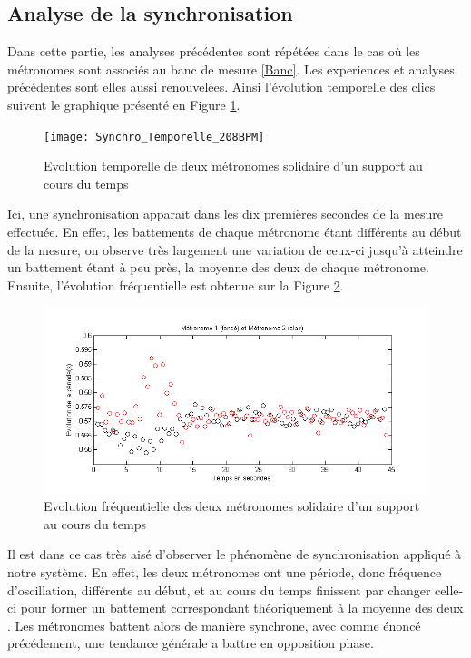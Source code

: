 \documentclass[a4paper,11pt]{report}
\begin{document}
\subsection{Analyse de la synchronisation}
Dans cette partie, les analyses précédentes sont répétées dans le cas où les métronomes sont associés au banc de mesure \ref{Banc}. Les experiences et analyses précédentes sont elles  aussi renouvelées. Ainsi l'évolution temporelle des clics suivent le graphique présenté en Figure \ref{SynchronisationT}.
\begin{figure}[h]
\centering
\texttt{[image: Synchro\_Temporelle\_208BPM]}
\caption{Evolution temporelle de deux métronomes solidaire d'un support au cours du temps}\label{SynchronisationT}
\end{figure}
Ici, une synchronisation apparait dans les dix premières secondes de la mesure effectuée. En effet, les battements de chaque métronome étant différents au début de la mesure, on observe très largement une variation de ceux-ci jusqu'à atteindre un battement étant à peu près, la moyenne des deux de chaque métronome. Ensuite, l'évolution fréquentielle est obtenue sur la Figure \ref{SynchronisationF}.
\begin{figure}[!h]
\centering
\includegraphics[width=1\textwidth]{Synchro_Frequence_208BPM}
\caption{Evolution fréquentielle des deux métronomes solidaire d'un support au cours du temps}\label{SynchronisationF}
\end{figure}
Il est dans ce cas très aisé d'observer le phénomène de synchronisation appliqué à notre système. En effet, les deux métronomes ont une période, donc fréquence d'oscillation, différente au début, et au cours du temps finissent par changer celle-ci pour former un battement correspondant théoriquement à la moyenne des deux \cite{piko}. Les métronomes battent alors de manière synchrone, avec comme énoncé précédement, une tendance générale a battre en opposition phase.
\end{document}
